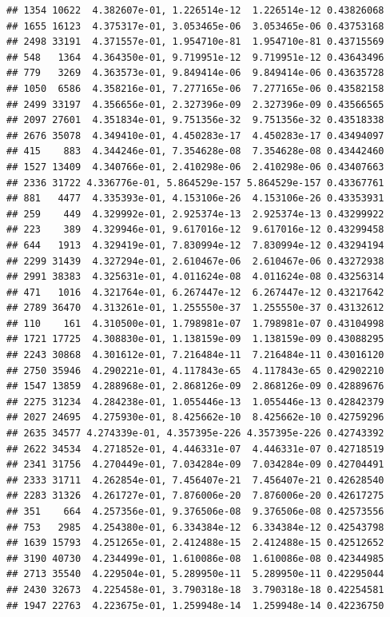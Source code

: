 \documentclass[
]{article}
\begin{document}
\begin{verbatim}
## 1354 10622  4.382607e-01, 1.226514e-12  1.226514e-12 0.43826068
## 1655 16123  4.375317e-01, 3.053465e-06  3.053465e-06 0.43753168
## 2498 33191  4.371557e-01, 1.954710e-81  1.954710e-81 0.43715569
## 548   1364  4.364350e-01, 9.719951e-12  9.719951e-12 0.43643496
## 779   3269  4.363573e-01, 9.849414e-06  9.849414e-06 0.43635728
## 1050  6586  4.358216e-01, 7.277165e-06  7.277165e-06 0.43582158
## 2499 33197  4.356656e-01, 2.327396e-09  2.327396e-09 0.43566565
## 2097 27601  4.351834e-01, 9.751356e-32  9.751356e-32 0.43518338
## 2676 35078  4.349410e-01, 4.450283e-17  4.450283e-17 0.43494097
## 415    883  4.344246e-01, 7.354628e-08  7.354628e-08 0.43442460
## 1527 13409  4.340766e-01, 2.410298e-06  2.410298e-06 0.43407663
## 2336 31722 4.336776e-01, 5.864529e-157 5.864529e-157 0.43367761
## 881   4477  4.335393e-01, 4.153106e-26  4.153106e-26 0.43353931
## 259    449  4.329992e-01, 2.925374e-13  2.925374e-13 0.43299922
## 223    389  4.329946e-01, 9.617016e-12  9.617016e-12 0.43299458
## 644   1913  4.329419e-01, 7.830994e-12  7.830994e-12 0.43294194
## 2299 31439  4.327294e-01, 2.610467e-06  2.610467e-06 0.43272938
## 2991 38383  4.325631e-01, 4.011624e-08  4.011624e-08 0.43256314
## 471   1016  4.321764e-01, 6.267447e-12  6.267447e-12 0.43217642
## 2789 36470  4.313261e-01, 1.255550e-37  1.255550e-37 0.43132612
## 110    161  4.310500e-01, 1.798981e-07  1.798981e-07 0.43104998
## 1721 17725  4.308830e-01, 1.138159e-09  1.138159e-09 0.43088295
## 2243 30868  4.301612e-01, 7.216484e-11  7.216484e-11 0.43016120
## 2750 35946  4.290221e-01, 4.117843e-65  4.117843e-65 0.42902210
## 1547 13859  4.288968e-01, 2.868126e-09  2.868126e-09 0.42889676
## 2275 31234  4.284238e-01, 1.055446e-13  1.055446e-13 0.42842379
## 2027 24695  4.275930e-01, 8.425662e-10  8.425662e-10 0.42759296
## 2635 34577 4.274339e-01, 4.357395e-226 4.357395e-226 0.42743392
## 2622 34534  4.271852e-01, 4.446331e-07  4.446331e-07 0.42718519
## 2341 31756  4.270449e-01, 7.034284e-09  7.034284e-09 0.42704491
## 2333 31711  4.262854e-01, 7.456407e-21  7.456407e-21 0.42628540
## 2283 31326  4.261727e-01, 7.876006e-20  7.876006e-20 0.42617275
## 351    664  4.257356e-01, 9.376506e-08  9.376506e-08 0.42573556
## 753   2985  4.254380e-01, 6.334384e-12  6.334384e-12 0.42543798
## 1639 15793  4.251265e-01, 2.412488e-15  2.412488e-15 0.42512652
## 3190 40730  4.234499e-01, 1.610086e-08  1.610086e-08 0.42344985
## 2713 35540  4.229504e-01, 5.289950e-11  5.289950e-11 0.42295044
## 2430 32673  4.225458e-01, 3.790318e-18  3.790318e-18 0.42254581
## 1947 22763  4.223675e-01, 1.259948e-14  1.259948e-14 0.42236750

\end{verbatim}
\end{document}
